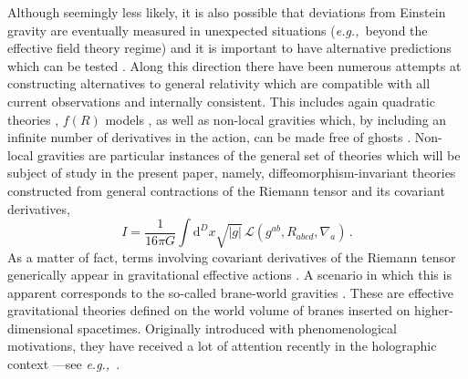 \documentclass[11pt]{article}
\newcommand{\diff}{\mathrm{d}}
\newcommand{\eg}{{\it e.g.,}\ }
\newcommand{\comment}[1]{{\bf [[[#1]]]}}
\begin{document}
 Although seemingly less likely, it is also possible that deviations from Einstein gravity are eventually measured in unexpected situations (\eg beyond the effective field theory regime) and it is important to have alternative predictions which can be tested \cite{Cayuso:2023xbc}.  Along this direction there have been numerous attempts at constructing alternatives to general relativity which are compatible with all current observations and internally consistent. This includes again quadratic theories \cite{Stelle:1976gc,Salvio:2018crh,Salvio:2019ewf}, $f(R)$ models \cite{Sotiriou}, as well as non-local gravities which, by including an infinite number of derivatives in the action, can be made free of ghosts \cite{Tomboulis:1997gg,Biswas:2005qr,Biswas:2010zk,Biswas:2011ar,Modesto:2011kw,Biswas:2013cha,Modesto:2014lga,Frolov:2015bta}.  
 Non-local gravities are particular instances of the general set of theories which will be subject of study in the present paper, namely, diffeomorphism-invariant theories constructed from general contractions of the Riemann tensor and its covariant derivatives,
\begin{equation}\label{GeneralAction}
I=\frac{1}{16\pi G} \int \diff^D x \sqrt{|g|}\, \mathcal{L}( g^{ab},R_{abcd},\nabla_a)\, .
\end{equation}
As a matter of fact, terms involving covariant derivatives of the Riemann tensor generically appear in gravitational effective actions \cite{Ruhdorfer:2019qmk,Li:2023wdz}. A scenario in which this is apparent corresponds to the so-called brane-world gravities \cite{Randall:1999ee,Randall:1999vf,Karch:2000ct}. These are effective gravitational theories defined on the world volume of branes inserted on higher-dimensional spacetimes.  Originally introduced with phenomenological motivations, they have received a lot of attention recently in the holographic context ---see \eg  \cite{Chen:2020uac,Chen:2020hmv,Emparan:2020znc}.


\end{document}
